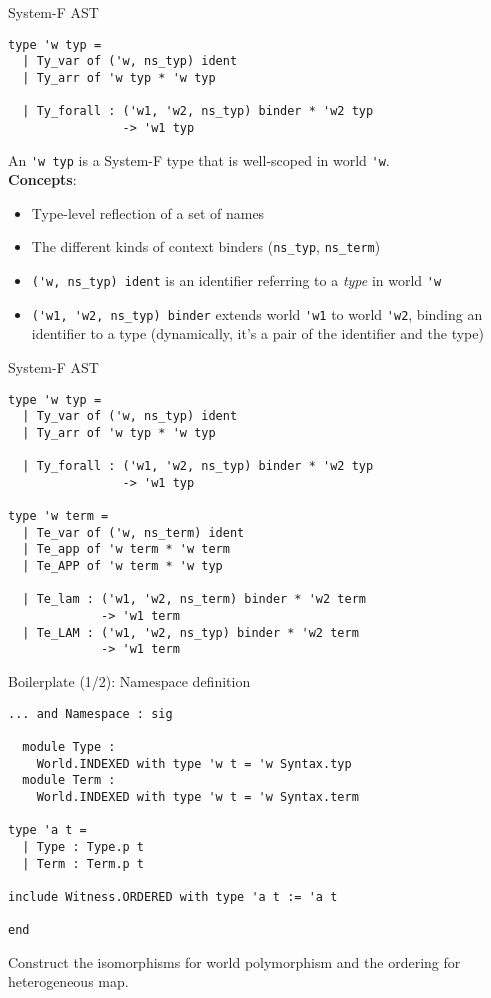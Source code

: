 \documentclass{beamer}          %
\begin{document}
\begin{frame}[fragile]{System-F AST}

\begin{lstlisting}
type 'w typ =
  | Ty_var of ('w, ns_typ) ident
  | Ty_arr of 'w typ * 'w typ

  | Ty_forall : ('w1, 'w2, ns_typ) binder * 'w2 typ
                -> 'w1 typ
\end{lstlisting}

An \lstinline{'w typ} is a System-F type that is well-scoped in world \lstinline{'w}.
~\\
\pause
\textbf{Concepts}:
\begin{itemize}
  \setlength{\itemindent}{1em}
  \item[World] Type-level reflection of a set of names
  \item[Namespace] The different kinds of context binders {\small (\texttt{ns\_typ}, \texttt{ns\_term})}
  \item[Ident] \lstinline{('w, ns_typ) ident} is an identifier referring to a {\em type}
        in world \lstinline{'w}
  \item[Binder] \lstinline{('w1, 'w2, ns_typ) binder} extends world \lstinline{'w1}
        to world \lstinline{'w2}, binding an identifier to a type (dynamically, it's a pair of the identifier and the type)
\end{itemize}

\end{frame}

\begin{frame}[fragile]{System-F AST}

\begin{lstlisting}
type 'w typ =
  | Ty_var of ('w, ns_typ) ident
  | Ty_arr of 'w typ * 'w typ

  | Ty_forall : ('w1, 'w2, ns_typ) binder * 'w2 typ
                -> 'w1 typ

type 'w term =
  | Te_var of ('w, ns_term) ident
  | Te_app of 'w term * 'w term
  | Te_APP of 'w term * 'w typ

  | Te_lam : ('w1, 'w2, ns_term) binder * 'w2 term
             -> 'w1 term
  | Te_LAM : ('w1, 'w2, ns_typ) binder * 'w2 term
             -> 'w1 term
\end{lstlisting}

\end{frame}

\begin{frame}[fragile]{Boilerplate (1/2): Namespace definition}

\begin{lstlisting}[xleftmargin=-0.2in]
... and Namespace : sig

  module Type :
    World.INDEXED with type 'w t = 'w Syntax.typ
  module Term :
    World.INDEXED with type 'w t = 'w Syntax.term

type 'a t =
  | Type : Type.p t
  | Term : Term.p t

include Witness.ORDERED with type 'a t := 'a t

end
\end{lstlisting}

Construct the isomorphisms for world polymorphism and the ordering for heterogeneous map.
\end{frame}
\end{document}

